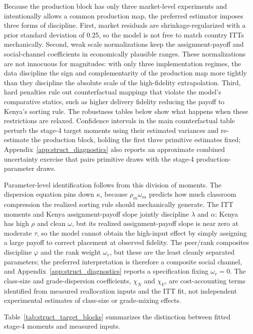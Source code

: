 \documentclass[11pt]{article}
\begin{document}
Because the production block has only three market-level experiments and intentionally allows a common production map, the preferred estimator imposes three forms of discipline. First, market residuals are shrinkage-regularized with a prior standard deviation of 0.25, so the model is not free to match country ITTs mechanically. Second, weak scale normalizations keep the assignment-payoff and social-channel coefficients in economically plausible ranges. These normalizations are not innocuous for magnitudes: with only three implementation regimes, the data discipline the sign and complementarity of the production map more tightly than they discipline the absolute scale of the high-fidelity extrapolation. Third, hard penalties rule out counterfactual mappings that violate the model's comparative statics, such as higher delivery fidelity reducing the payoff to Kenya's sorting rule. The robustness tables below show what happens when these restrictions are relaxed. Confidence intervals in the main counterfactual table perturb the stage-4 target moments using their estimated variances and re-estimate the production block, holding the first three primitive estimates fixed; Appendix~\ref{app:struct_diagnostics} also reports an approximate combined uncertainty exercise that pairs primitive draws with the stage-4 production-parameter draws.

Parameter-level identification follows from this division of moments. The dispersion equation pins down $\kappa$, because $\rho_m\omega_m$ predicts how much classroom compression the realized sorting rule should mechanically generate. The ITT moments and Kenya assignment-payoff slope jointly discipline $\lambda$ and $\alpha$: Kenya has high $\rho$ and clean $\omega$, but its realized assignment-payoff slope is near zero at moderate $\tau$, so the model cannot obtain the high-input effect by simply assigning a large payoff to correct placement at observed fidelity. The peer/rank composites discipline $\varphi$ and the rank weight $\omega_r$, but these are the least cleanly separated parameters; the preferred interpretation is therefore a composite social channel, and Appendix~\ref{app:struct_diagnostics} reports a specification fixing $\omega_r=0$. The class-size and grade-dispersion coefficients, $\chi_N$ and $\chi_V$, are cost-accounting terms identified from measured reallocation inputs and the ITT fit, not independent experimental estimates of class-size or grade-mixing effects.

Table~\ref{tab:struct_target_blocks} summarizes the distinction between fitted stage-4 moments and measured inputs.
\end{document}

